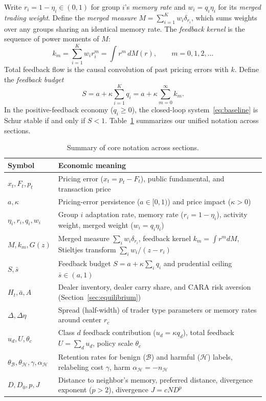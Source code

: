 \documentclass[11pt,letterpaper]{article}
\theoremstyle{definition}
\begin{document}
Write $r_i = 1 - \eta_i \in (0, 1)$ for group $i$'s \emph{memory rate} and $w_i = q_i \eta_i$ for its \emph{merged trading weight}. Define the \emph{merged measure} $M = \sum_{i=1}^K w_i \delta_{r_i}$, which sums weights over any groups sharing an identical memory rate. The \emph{feedback kernel} is the sequence of power moments of $M$:
\begin{equation}\label{eq:kernel}
  k_m = \sum_{i=1}^K w_i r_i^m = \int r^m \, dM(r), \qquad m = 0, 1, 2, \dots
\end{equation}
Total feedback flow is the causal convolution of past pricing errors with $k$. Define the \emph{feedback budget}
\begin{equation}\label{eq:budget}
  S = a + \kappa \sum_{i=1}^K q_i = a + \kappa \sum_{m=0}^\infty k_m.
\end{equation}
In the positive-feedback economy ($q_i \ge 0$), the closed-loop system~\eqref{eq:baseline} is Schur stable if and only if $S < 1$. Table~\ref{tab:notation} summarizes our unified notation across sections.

\begin{table}[!htbp]
\centering
\caption{Summary of core notation across sections.}
\label{tab:notation}
\small
\begin{tabularx}{\linewidth}{@{}lX@{}}
\toprule
Symbol & Economic meaning \\
\midrule
$x_t, F_t, p_t$ & Pricing error ($x_t = p_t - F_t$), public fundamental, and transaction price \\
$a, \kappa$ & Pricing-error persistence ($a \in [0,1)$) and price impact ($\kappa > 0$) \\
$\eta_i, r_i, q_i, w_i$ & Group $i$ adaptation rate, memory rate ($r_i = 1-\eta_i$), activity weight, merged weight ($w_i = q_i \eta_i$) \\
$M, k_m, G(z)$ & Merged measure $\sum_i w_i \delta_{r_i}$, feedback kernel $k_m = \int r^m dM$, Stieltjes transform $\sum_i w_i/(z - r_i)$ \\
$S, \bar{s}$ & Feedback budget $S = a + \kappa \sum_i q_i$ and prudential ceiling $\bar{s} \in (a, 1)$ \\
$H_t, \bar{a}, A$ & Dealer inventory, dealer carry share, and CARA risk aversion (Section~\ref{sec:equilibrium}) \\
$\Delta, \Delta\eta$ & Spread (half-width) of trader type parameters or memory rates around center $r_c$ \\
$u_d, U, \theta_c$ & Class $d$ feedback contribution ($u_d = \kappa q_d$), total feedback $U = \sum_d u_d$, policy scale $\theta_c$ \\
$\theta_{\mathcal{B}}, \theta_{\mathcal{H}}, \gamma, \alpha_{\mathcal{H}}$ & Retention rates for benign ($\mathcal{B}$) and harmful ($\mathcal{H}$) labels, relabeling cost $\gamma$, harm $\alpha_{\mathcal{H}} = -n_{\mathcal{H}}$ \\
$D, D_0, p, J$ & Distance to neighbor's memory, preferred distance, divergence exponent ($p > 2$), divergence $J = cND^p$ \\
\bottomrule
\end{tabularx}
\end{table}
\end{document}
